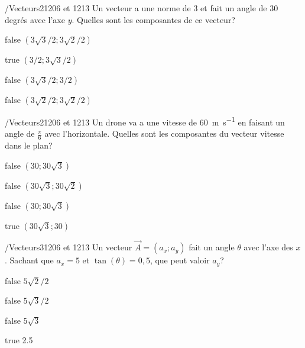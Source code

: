             \begin{question}{/}{Vecteurs}{2}{1206 et 1213}
                Un vecteur a une norme de 3 et fait un angle de 30 degrés avec l'axe $y$. Quelles sont les composantes de ce vecteur?
            \end{question}
            \begin{reponses}
                \item[false] $(3\sqrt{3}/2;3\sqrt{2}/2)$ 
                \item[true] $(3/2;3\sqrt{3}/2)$ 
                \item[false] $(3\sqrt{3}/2;3/2)$ 
                \item[false] $(3\sqrt{2}/2;3\sqrt{2}/2)$ 
            \end{reponses}
            \begin{question}{/}{Vecteurs}{2}{1206 et 1213}
                Un drone va a une vitesse de \SI{60}{\meter\per\second} en faisant un angle de $\frac{\pi}{6}$ avec l'horizontale. Quelles sont les composantes du vecteur vitesse dans le plan?
            \end{question}
            \begin{reponses}
                \item[false] $(30; 30\sqrt{3})$
                \item[false] $(30\sqrt{3}; 30\sqrt{2})$
                \item[false] $(30; 30\sqrt{3})$
                \item[true] $(30\sqrt{3}; 30)$
            \end{reponses}
        	\begin{question}{/}{Vecteurs}{3}{1206 et 1213}
				Un vecteur $\vec{A}=(a_x;a_y)$ fait un angle $\theta$ avec l'axe des $x$. Sachant que $a_x=5$ et $\tan(\theta)=0,5$, que peut valoir $a_y$?
            \end{question}
            \begin{reponses}
            	\item[false] $5\sqrt{2}/2$
            	\item[false] $5\sqrt{3}/2$
                \item[false] $5\sqrt{3}$
                \item[true] 2.5
            \end{reponses}
